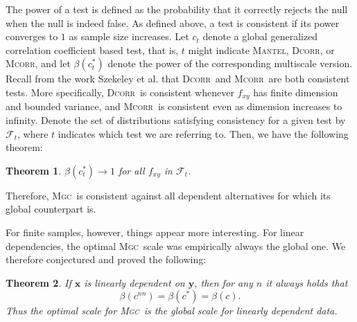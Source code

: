 \documentclass[11pt]{article}
\providecommand{\sct}[1]{{\normalfont\textsc{#1}}}
\providecommand{\mb}[1]{\boldsymbol{#1}}
\providecommand{\mc}[1]{\mathcal{#1}}
\newcommand{\G}{c}
\newcommand{\Mgc}{\sct{Mgc}}
\newcommand{\Dcorr}{\sct{Dcorr}}
\newcommand{\Mcorr}{\sct{Mcorr}}
\newcommand{\Mantel}{\sct{Mantel}}
\newtheorem{thm}{Theorem}
\begin{document}
The power of a test is defined as the probability that it correctly rejects the null when the null is indeed false.  As defined above, a test is consistent if its power converges to $1$ as sample size increases.
Let $\G_t$ denote a global generalized correlation coefficient based test, that is, $t$ might indicate \Mantel, \Dcorr, or \Mcorr, and let $\beta(\G_t^*)$ denote the power of the corresponding multiscale version.
Recall from the work Szekeley et al. that \Dcorr~and \Mcorr~are both consistent tests. More specifically, \Dcorr~is consistent whenever $f_{xy}$ has finite dimension and bounded variance, and \Mcorr~is consistent even as dimension increases to infinity.  Denote the set of distributions satisfying consistency for a given test by $\mc{F}_t$, where $t$ indicates which test we are referring to. Then, we have the following theorem:
\begin{thm}
\label{thm1}
$\beta(\G_t^*) \rightarrow 1$ for all $f_{xy}$ in $\mc{F}_t$.
\end{thm}

Therefore, \Mgc~is consistent against all dependent alternatives for which its global counterpart is. 

For finite samples, however, things appear more interesting.
For linear dependencies,  the optimal \Mgc~scale was empirically always the global one. We therefore conjectured and proved the following:
\begin{thm}
\label{t:linear}
If $\mb{x}$ is linearly dependent on $\mb{y}$, then for any $n$ it always holds that
\begin{equation}
\beta(\G^{nn}) = \beta(\G^{*}) = \beta(\G).
\end{equation}
Thus the optimal scale for \Mgc~is the global scale for linearly dependent data.
\end{thm}
\end{document}

